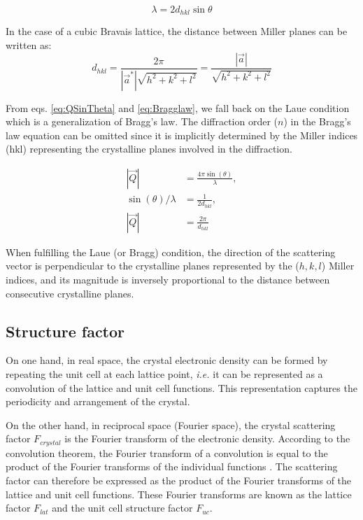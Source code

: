 \begin{equation}
    \label{eq:Bragglaw}
    \lambda = 2d_{hkl} \sin{\theta}%
\end{equation}

In the case of a cubic Bravais lattice, the distance between Miller planes can be written as:
\begin{equation}
    \label{eq:Interplanarspacing}
    d_{hkl}=\frac{2\pi}{|\vec{a}^*|\sqrt{h^2 + k^2 + l^2}}=\frac{|\vec{a}|}{\sqrt{h^2 + k^2 + l^2}}
\end{equation}

From eqs. \ref{eq:QSinTheta} and \ref{eq:Bragglaw}, we fall back on the Laue condition which is a generalization of Bragg's law.
The diffraction order ($n$) in the Bragg's law equation can be omitted since it is implicitly determined by the Miller indices (hkl) representing the crystalline planes involved in the diffraction.

\begin{align}
    \label{eq:QandD1}
    |\vec{Q}| & = \frac{4\pi \sin(\theta)}{\lambda},\\
    \label{eq:QandD2}
    \sin(\theta) / \lambda & = \frac{1}{2d_{hkl}},\\
    \label{eq:QandD3}
    |\vec{Q}| & = \frac{2\pi}{d_{hkl}}
\end{align}{}

When fulfilling the Laue (or Bragg) condition, the direction of the scattering vector is perpendicular to the crystalline planes represented by the ($h, k, l$) Miller indices, and its magnitude is inversely proportional to the distance between consecutive crystalline planes.

\subsection{Structure factor} \label{sec:StructureFactor}

On one hand, in real space, the crystal electronic density can be formed by repeating the unit cell at each lattice point, \textit{i.e.} it can be represented as a convolution of the lattice and unit cell functions.
This representation captures the periodicity and arrangement of the crystal.

On the other hand, in reciprocal space (Fourier space), the crystal scattering factor $F_{crystal}$ is the Fourier transform of the electronic density.
According to the convolution theorem, the Fourier transform of a convolution is equal to the product of the Fourier transforms of the individual functions \parencite{MCALISTER2003629}.
The scattering factor can therefore be expressed as the product of the Fourier transforms of the lattice and unit cell functions.
These Fourier transforms are known as the lattice factor $F_{lat}$ and the unit cell structure factor $F_{uc}$.

